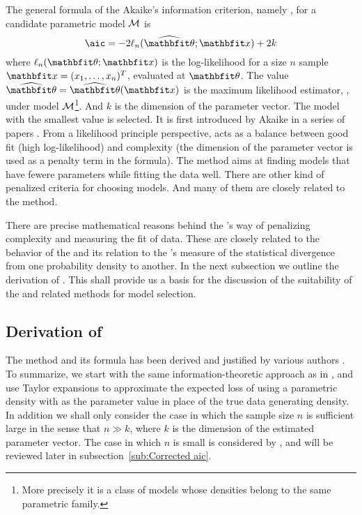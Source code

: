 The general formula of the Akaike's information criterion, namely \aic, for a
candidate parametric model $\mathcal{M}$ is
\begin{equation}
  \text{\aic} = -2\ell_n(\hbth;\bfx) + 2k
\end{equation}
where $\ell_n(\bth;\bfx)$ is the log-likelihood for a size $n$ sample
$\bfx=(x_1,\dots,x_n)^T$, evaluated at $\bth$. The value $\hbth = \hbth(\bfx)$
is the maximum likelihood estimator, \mle, under model $\mathcal{M}$\footnote{More
  precisely it is a class of models whose densities belong to the same
  parametric family.}. And $k$ is the dimension of the parameter vector. The
model with the smallest \aic value is selected. It is first introduced by
Akaike in a series of papers \parencite{Akaike1973, Akaike1974, Akaike1977,
  Akaike1981}. From a likelihood principle perspective, \aic acts as a balance
between good fit (high log-likelihood) and complexity (the dimension of the
parameter vector is used as a penalty term in the formula). The \aic method
aims at finding models that have fewere parameters while fitting the data
well.  There are other kind of penalized criteria for choosing models. And
many of them are closely related to the \aic method.

There are precise mathematical reasons behind the \aic's way of penalizing
complexity and measuring the fit of data. These are closely related to the
behavior of the \mle and its relation to the \textcite{Kullback1951}'s measure
of the statistical divergence from one probability density to another. In the
next subsection we outline the derivation of \aic. This shall provide us a
basis for the discussion of the suitability of the \aic and related methods
for model selection.

\subsection{Derivation of \protect\aic}
\label{sub:Derivation of aic}

The \aic method and its formula has been derived and justified by various
authors \parencite[e.g.][]{Stone1982, Sawa1978, Chow1981, Bozdogan1987,
  Akaike1973, Claeskens2008}. To summarize, we start with the same
information-theoretic approach as in \textcite{Akaike1973}, and use Taylor
expansions to approximate the expected loss of using a parametric density with
\mle as the parameter value in place of the true data generating density. In
addition we shall only consider the case in which the sample size $n$ is
sufficient large in the sense that $n\gg k$, where $k$ is the dimension of the
estimated parameter vector. The case in which $n$ is small is considered by
\textcite{Hurvich1989}, and will be reviewed later in
subsection~\ref{sub:Corrected aic}.


